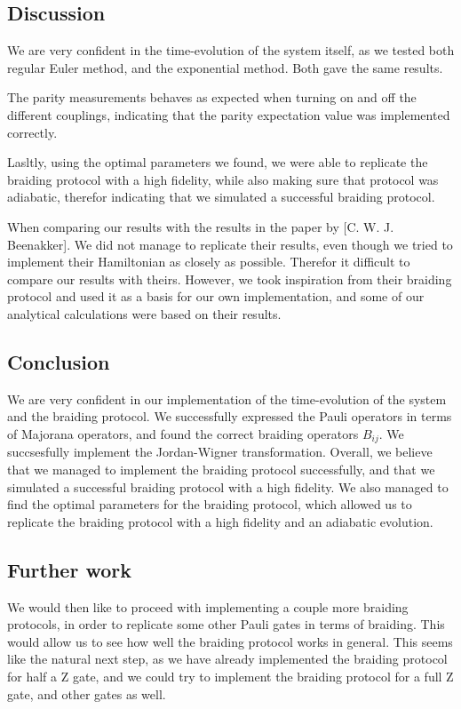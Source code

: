 \documentclass[11pt,landscape]{article}
\begin{document}
\subsection{Discussion}\label{discussion}

We are very confident in the time-evolution of the system itself, as we
tested both regular Euler method, and the exponential method. Both gave
the same results.

The parity measurements behaves as expected when turning on and off the
different couplings, indicating that the parity expectation value was
implemented correctly.

Lasltly, using the optimal parameters we found, we were able to
replicate the braiding protocol with a high fidelity, while also making
sure that protocol was adiabatic, therefor indicating that we simulated
a successful braiding protocol.

When comparing our results with the results in the paper by {[}C. W. J.
Beenakker{]}. We did not manage to replicate their results, even though
we tried to implement their Hamiltonian as closely as possible. Therefor
it difficult to compare our results with theirs. However, we took
inspiration from their braiding protocol and used it as a basis for our
own implementation, and some of our analytical calculations were based
on their results.

\subsection{Conclusion}\label{conclusion}

We are very confident in our implementation of the time-evolution of the
system and the braiding protocol. We successfully expressed the Pauli
operators in terms of Majorana operators, and found the correct braiding
operators \(B_{ij}\). We succsesfully implement the Jordan-Wigner
transformation. Overall, we believe that we managed to implement the
braiding protocol successfully, and that we simulated a successful
braiding protocol with a high fidelity. We also managed to find the
optimal parameters for the braiding protocol, which allowed us to
replicate the braiding protocol with a high fidelity and an adiabatic
evolution.

\subsection{Further work}\label{further-work}

We would then like to proceed with implementing a couple more braiding
protocols, in order to replicate some other Pauli gates in terms of
braiding. This would allow us to see how well the braiding protocol
works in general. This seems like the natural next step, as we have
already implemented the braiding protocol for half a Z gate, and we
could try to implement the braiding protocol for a full Z gate, and
other gates as well.
\end{document}
